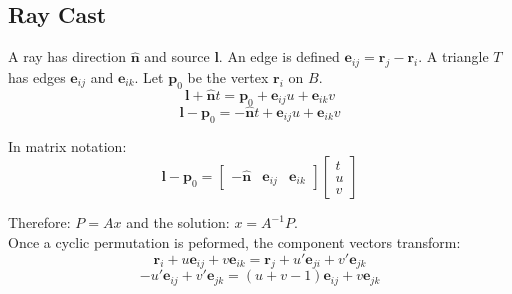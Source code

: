\subsection{Ray Cast}
A ray has direction $\mathbf{\hat n}$ and source $\mathbf l$. An edge is defined $\mathbf e_{ij} = \mathbf r_j - \mathbf r_i$. A triangle $T$ has edges $\mathbf e_{ij}$ and $\mathbf e_{ik}$. Let $\mathbf p_0$ be the vertex $\mathbf r_i$ on $B$. 
$$ \mathbf l + \mathbf{\hat n}t = \mathbf p_0 + \mathbf e_{ij}u + \mathbf e_{ik}v $$
$$ \mathbf l - \mathbf p_0 =  -\mathbf{\hat n}t + \mathbf e_{ij}u + \mathbf e_{ik}v $$

In matrix notation:
$$ \mathbf l - \mathbf p_0 = 
 \begin{bmatrix}
  -\mathbf{\hat n} & \mathbf e_{ij} & \mathbf e_{ik}
 \end{bmatrix}
 \begin{bmatrix}
  t \\
  u \\
  v
 \end{bmatrix}
$$

Therefore: $P = Ax$ and the solution: $x = A^{-1} P$. \\

Once a cyclic permutation is peformed, the component vectors transform:
$$
\mathbf r_i + u \mathbf e_{ij} + v \mathbf e_{ik} = \mathbf r_j + u' \mathbf e_{ji} + v' \mathbf e_{jk}
$$
$$
-u' \mathbf e_{ij} + v' \mathbf e_{jk} = \left(u+v-1\right)\mathbf e_{ij} + v \mathbf e_{jk}
$$



